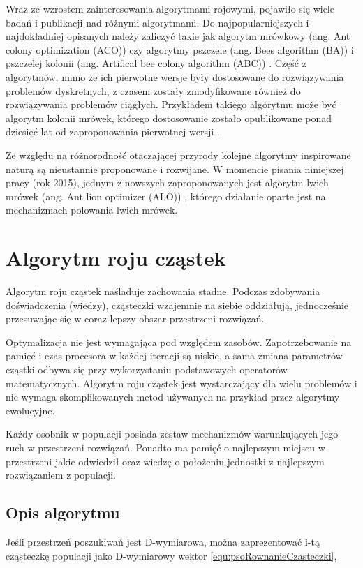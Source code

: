 Wraz ze wzrostem zainteresowania algorytmami rojowymi, pojawiło się wiele badań i publikacji nad różnymi algorytmami. Do najpopularniejszych i najdokładniej opisanych należy zaliczyć takie jak algorytm mrówkowy (ang. Ant colony optimization (ACO)) \cite{ACO} czy algorytmy pszczele (ang. Bees algorithm (BA)) \cite{BA} i pszczelej kolonii (ang. Artifical bee colony algorithm (ABC)) \cite{ABC}. Część z algorytmów, mimo że ich pierwotne wersje były dostosowane do rozwiązywania problemów dyskretnych, z czasem zostały zmodyfikowane również do rozwiązywania problemów ciągłych. Przykładem takiego algorytmu może być algorytm kolonii mrówek, którego dostosowanie zostało opublikowane ponad dziesięć lat od zaproponowania pierwotnej wersji \cite{ACO2}. 

Ze względu na różnorodność otaczającej przyrody kolejne algorytmy inspirowane naturą są nieustannie proponowane i rozwijane. W momencie pisania niniejszej pracy (rok 2015), jednym z nowszych zaproponowanych jest algorytm lwich mrówek (ang. Ant lion optimizer (ALO)) \cite{ALO}, którego działanie oparte jest na mechanizmach polowania lwich mrówek.

\section{Algorytm roju cząstek}
\label{sec:psoOpis}
Algorytm roju cząstek naśladuje zachowania stadne. Podczas zdobywania doświadczenia (wiedzy), cząsteczki wzajemnie na siebie oddziałują, jednocześnie przesuwając się w coraz lepszy obszar przestrzeni rozwiązań. 

Optymalizacja nie jest wymagająca pod względem zasobów. Zapotrzebowanie na pamięć i czas procesora w każdej iteracji są niskie, a sama zmiana parametrów cząstki odbywa się przy wykorzystaniu podstawowych operatorów matematycznych. Algorytm roju cząstek jest wystarczający dla wielu problemów i nie wymaga skomplikowanych metod używanych na przykład przez algorytmy ewolucyjne.

Każdy osobnik w populacji posiada zestaw mechanizmów warunkujących jego ruch w przestrzeni rozwiązań. Ponadto ma pamięć o najlepszym miejscu w przestrzeni jakie odwiedził oraz wiedzę o położeniu jednostki z najlepszym rozwiązaniem z populacji.

\subsection{Opis algorytmu}
\label{sec:psoRownania}
Jeśli przestrzeń poszukiwań jest D-wymiarowa, można zaprezentować i-tą cząsteczkę populacji jako D-wymiarowy wektor \ref{equ:psoRownanieCzasteczki},

